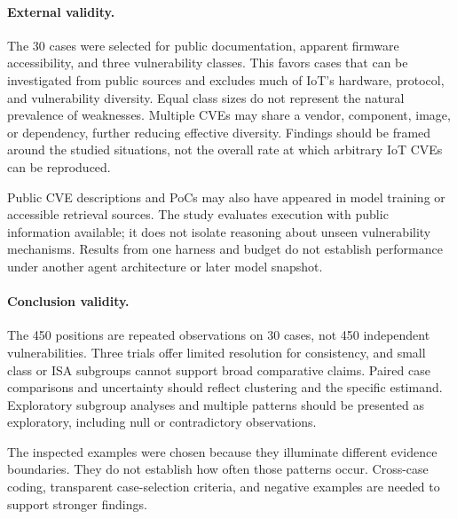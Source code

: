 \paragraph{External validity.}
The 30 cases were selected for public documentation, apparent firmware
accessibility, and three vulnerability classes. This favors cases that
can be investigated from public sources and excludes much of IoT's
hardware, protocol, and vulnerability diversity. Equal class sizes do
not represent the natural prevalence of weaknesses. Multiple CVEs may
share a vendor, component, image, or dependency, further reducing effective
diversity. Findings should be framed around the studied situations,
not the overall rate at which arbitrary IoT CVEs can be reproduced.

Public CVE descriptions and PoCs may also have appeared in model training
or accessible retrieval sources. The study evaluates execution with
public information available; it does not isolate reasoning about unseen
vulnerability mechanisms. Results from one harness and budget do not
establish performance under another agent architecture or later model
snapshot. 

\paragraph{Conclusion validity.}
The 450 positions are repeated observations on 30 cases, not 450
independent vulnerabilities. Three trials offer limited resolution for
consistency, and small class or ISA subgroups cannot support broad
comparative claims. Paired case comparisons and uncertainty should reflect
clustering and the specific estimand. Exploratory subgroup analyses and
multiple patterns should be presented as exploratory, including null or
contradictory observations.

The inspected examples were chosen because they illuminate different
evidence boundaries. They do not establish how often those patterns
occur. Cross-case coding, transparent case-selection criteria, and
negative examples are needed to support stronger findings.

